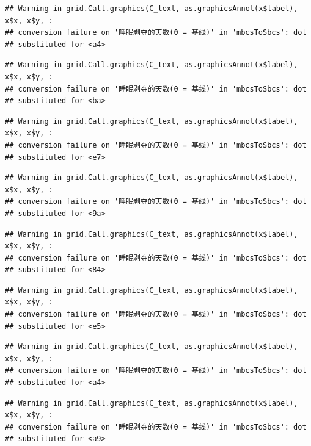 \documentclass[
]{book}
\begin{document}
\begin{verbatim}
## Warning in grid.Call.graphics(C_text, as.graphicsAnnot(x$label), x$x, x$y, :
## conversion failure on '睡眠剥夺的天数(0 = 基线)' in 'mbcsToSbcs': dot
## substituted for <a4>
\end{verbatim}

\begin{verbatim}
## Warning in grid.Call.graphics(C_text, as.graphicsAnnot(x$label), x$x, x$y, :
## conversion failure on '睡眠剥夺的天数(0 = 基线)' in 'mbcsToSbcs': dot
## substituted for <ba>
\end{verbatim}

\begin{verbatim}
## Warning in grid.Call.graphics(C_text, as.graphicsAnnot(x$label), x$x, x$y, :
## conversion failure on '睡眠剥夺的天数(0 = 基线)' in 'mbcsToSbcs': dot
## substituted for <e7>
\end{verbatim}

\begin{verbatim}
## Warning in grid.Call.graphics(C_text, as.graphicsAnnot(x$label), x$x, x$y, :
## conversion failure on '睡眠剥夺的天数(0 = 基线)' in 'mbcsToSbcs': dot
## substituted for <9a>
\end{verbatim}

\begin{verbatim}
## Warning in grid.Call.graphics(C_text, as.graphicsAnnot(x$label), x$x, x$y, :
## conversion failure on '睡眠剥夺的天数(0 = 基线)' in 'mbcsToSbcs': dot
## substituted for <84>
\end{verbatim}

\begin{verbatim}
## Warning in grid.Call.graphics(C_text, as.graphicsAnnot(x$label), x$x, x$y, :
## conversion failure on '睡眠剥夺的天数(0 = 基线)' in 'mbcsToSbcs': dot
## substituted for <e5>
\end{verbatim}

\begin{verbatim}
## Warning in grid.Call.graphics(C_text, as.graphicsAnnot(x$label), x$x, x$y, :
## conversion failure on '睡眠剥夺的天数(0 = 基线)' in 'mbcsToSbcs': dot
## substituted for <a4>
\end{verbatim}

\begin{verbatim}
## Warning in grid.Call.graphics(C_text, as.graphicsAnnot(x$label), x$x, x$y, :
## conversion failure on '睡眠剥夺的天数(0 = 基线)' in 'mbcsToSbcs': dot
## substituted for <a9>
\end{verbatim}
\end{document}
